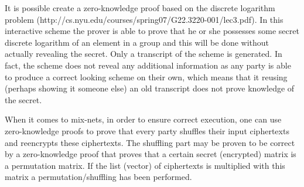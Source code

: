It is possible create a zero-knowledge proof based on the discrete
logarithm problem
(http://cs.nyu.edu/courses/spring07/G22.3220-001/lec3.pdf). In this
interactive scheme the prover is able to prove that he or she
possesses some secret discrete logarithm of an element in a group and
this will be done without actually revealing the secret. Only a
transcript of the scheme is generated. In fact, the scheme does not
reveal any additional information as any party is able to produce a
correct looking scheme on their own, which means that it reusing
(perhaps showing it someone else) an old transcript does not prove
knowledge of the secret.

When it comes to mix-nets, in order to ensure correct execution, one
can use zero-knowledge proofs to prove that every party shuffles their
input ciphertexts and reencrypts these ciphertexts. The shuffling part
may be proven to be correct by a zero-knowledge proof that proves that
a certain secret (encrypted) matrix is a permutation matrix. If the
list (vector) of ciphertexts is multiplied with this matrix a
permutation/shuffling has been performed.






